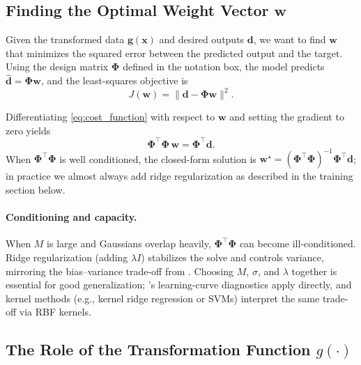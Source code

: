 \subsection{Finding the Optimal Weight Vector \texorpdfstring{\(\mathbf{w}\)}{w}}
\label{sec:rbf_finding_the_optimal_weight_vector_w_w}

Given the transformed data \(\mathbf{g}(\mathbf{x})\) and desired outputs \(\mathbf{d}\), we want to find \(\mathbf{w}\) that minimizes the squared error between the predicted output and the target. Using the design matrix \(\boldsymbol{\Phi}\) defined in the notation box, the model predicts \(\hat{\mathbf{d}}=\boldsymbol{\Phi}\mathbf{w}\), and the least-squares objective is
\begin{equation}
J(\mathbf{w}) = \|\mathbf{d} - \boldsymbol{\Phi} \mathbf{w}\|^2.
\label{eq:cost_function}
\end{equation}

Differentiating \eqref{eq:cost_function} with respect to \(\mathbf{w}\) and setting the gradient to zero yields
\begin{equation}
\boldsymbol{\Phi}^\top \boldsymbol{\Phi} \,\mathbf{w} = \boldsymbol{\Phi}^\top \mathbf{d}.
\label{eq:normal_eq_weights}
\end{equation}
When \(\boldsymbol{\Phi}^\top\boldsymbol{\Phi}\) is well conditioned, the closed-form solution is \(\mathbf{w}^\star=(\boldsymbol{\Phi}^\top\boldsymbol{\Phi})^{-1}\boldsymbol{\Phi}^\top\mathbf{d}\); in practice we almost always add ridge regularization as described in the training section below.

\paragraph{Conditioning and capacity.} When \(M\) is large and Gaussians overlap heavily, \(\boldsymbol{\Phi}^\top\boldsymbol{\Phi}\) can become ill-conditioned. Ridge regularization (adding \(\lambda I\)) stabilizes the solve and controls variance, mirroring the bias--variance trade-off from . Choosing \(M\), \(\sigma\), and \(\lambda\) together is essential for good generalization; 's learning-curve diagnostics apply directly, and kernel methods (e.g., kernel ridge regression or SVMs) interpret the same trade-off via RBF kernels.

\subsection{The Role of the Transformation Function \texorpdfstring{\(g(\cdot)\)}{g(.)}}
\label{sec:rbf_the_role_of_the_transformation_function_g_g}


